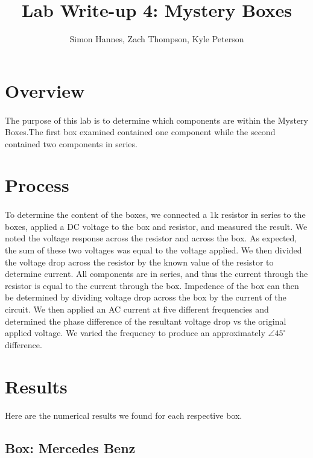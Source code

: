 \documentclass{article}
\title{Lab Write-up 4: Mystery Boxes}
\author{Simon Hannes, Zach Thompson, Kyle Peterson}
\begin{document}
\maketitle{}

\section*{Overview}
\paragraph{}
The purpose of this lab is to determine which components are within the Mystery
Boxes.The first box examined contained one component while the second contained
two components in series. 

\section*{Process}
\paragraph{}
To determine the content of the boxes, we connected a 1k resistor in series
to the boxes, applied a DC voltage to the box and resistor, and measured the
result. We noted the voltage response across the resistor and across the box.
As expected, the sum of these two voltages was equal to the voltage applied.
We then divided the voltage drop across the resistor by the known value of
the resistor to determine current. All components are in series, and thus the
current through the resistor is equal to the current through the box. Impedence
of the box can then be determined by dividing voltage drop across the box by
the current of the circuit. We then applied an AC current at five different
frequencies and determined the phase difference of the resultant voltage drop
vs the original applied voltage. We varied the frequency to produce an
approximately $\angle{}45^\circ{}$ difference. 

\section*{Results}
\paragraph{}
Here are the numerical results we found for each respective box.

\subsection*{Box: Mercedes Benz}
\end{document}
